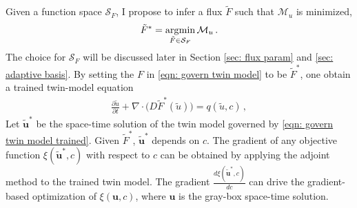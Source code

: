 Given a function space $\mathcal{S}_F$,
I propose to infer a flux $\tilde{F}$ such that $\mathcal{M}_u$ is minimized,
\begin{equation}
    \tilde{F}^* = \operatorname*{\arg\!\min}_{\tilde{F} \in \mathcal{S}_F} \mathcal{M}_u\,.
    \label{eqn: twin min mismatch}
\end{equation}
The choice for $\mathcal{S}_F$ will be discussed later in Section \ref{sec: flux param} and
\ref{sec: adaptive basis}. By setting the $F$ in \eqref{eqn: govern twin model} to be $\tilde{F}^*$,
one obtain a trained twin-model equation
\begin{equation}\begin{split}
    \frac{\partial \tilde{u}}{\partial t}+ \nabla \cdot \big(D \tilde{F}^*(\tilde{u})\big) = q(\tilde{u},c)\,,
\end{split}
\label{eqn: govern twin model trained}
\end{equation}
Let $\tilde{\boldsymbol{u}}^*$ be the space-time solution of the twin model governed by \eqref{eqn: govern twin model trained}.
Given $\tilde{F}^*$, $\tilde{\boldsymbol{u}}^*$ depends on $c$. 
The gradient of any objective function $\xi(\tilde{\boldsymbol{u}}^*, c)$ with respect to $c$
can be obtained by applying the adjoint method to the trained twin model.
The gradient $\frac{d \xi(\tilde{\boldsymbol{u}}^*, c)}{dc}$ can drive the 
gradient-based optimization of 
$\xi({\boldsymbol{u}}, c)$, where ${\boldsymbol{u}}$ is the gray-box space-time solution.\\

